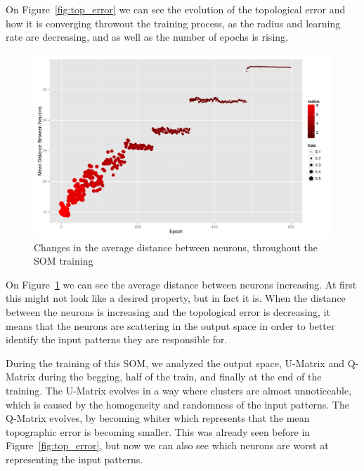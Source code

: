 \documentclass[journal]{IEEEtran}
\begin{document}
On Figure~\ref{fig:top_error} we can see the evolution of the topological error and how it is converging throwout the training process, as the radius and learning rate are decreasing, and as well as the number of epochs is rising. 

\begin{figure}[h]
  \centering
  \includegraphics[width=1\linewidth]{./plots/som/average_distance.pdf}
  \caption{Changes in the average distance between neurons, throughout the SOM training}
  \label{avg_dist}
\end{figure}

On Figure~\ref{avg_dist} we can see the average distance between neurons increasing. At first this might not look like a desired property, but in fact it is. When the distance between the neurons is increasing and the topological error is decreasing, it means that the neurons are scattering in the output space in order to better identify the input patterns they are responsible for.

During the training of this \ac{SOM}, we analyzed the output space, \ac{U-Matrix} and \ac{Q-Matrix} during the begging, half of the train, and finally at the end of the training.
The \ac{U-Matrix} evolves in a way where clusters are almost unnoticeable, which is caused by the homogeneity and randomness of the input patterns. 
The \ac{Q-Matrix} evolves, by becoming whiter which represents that the mean topographic error is becoming smaller. This was already seen before in Figure~\ref{fig:top_error}, but now we can also see which neurons are worst at representing the input patterns.  
\end{document}
